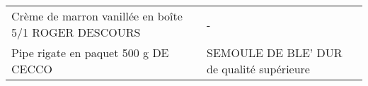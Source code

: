 \begin{longtable}{p{5cm}p{10cm}}
                                                     Crème de marron vanillée en boîte 5/1 ROGER DESCOURS &                                                                                                                                                                                                                                                                                                                                                                                                                                                                                                                                                                                                                                                                                                                                                                                                                                                                                                                                                                                                                                        - \\
                                                                     Pipe rigate en paquet 500 g DE CECCO &                                                                                                                                                                                                                                                                                                                                                                                                                                                                                                                                                                                                                                                                                                                                                                                                                                                                                                                                                                                                SEMOULE DE BLE' DUR de qualité supérieure \\

\end{longtable}
